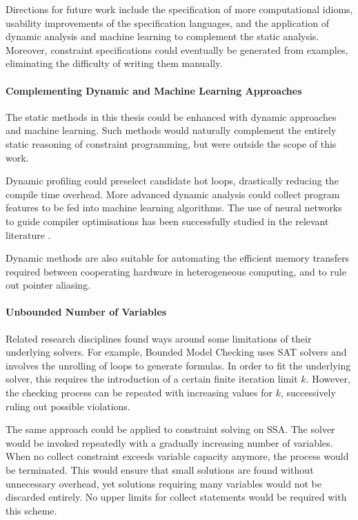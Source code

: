     Directions for future work include the specification of more computational
    idioms, usability improvements of the specification languages, and the
    application of dynamic analysis and machine learning to complement the
    static analysis.
    Moreover, constraint specifications could eventually be generated from
    examples, eliminating the difficulty of writing them manually.

\paragraph*{Complementing Dynamic and Machine Learning Approaches}

    The static methods in this thesis could be enhanced with dynamic approaches
    and machine learning.
    Such methods would naturally complement the entirely static reasoning of
    constraint programming, but were outside the scope of this work.

    Dynamic profiling could preselect candidate hot loops, drastically reducing
    the compile time overhead.
    More advanced dynamic analysis could collect program features to be fed into
    machine learning algorithms.
    The use of neural networks to guide compiler optimisations has been
    successfully studied in the relevant literature
    \citep{DBLP:journals/pieee/WangO18}.

    Dynamic methods are also suitable for automating the efficient memory
    transfers required between cooperating hardware in heterogeneous
    computing, and to rule out pointer aliasing.

\paragraph*{Unbounded Number of Variables}

    Related research disciplines found ways around some limitations of their
    underlying solvers.
    For example, Bounded Model Checking \cite{Clarke:2001:BMC:510986.510987}
    uses SAT solvers and involves the unrolling of loops to generate formulas.
    In order to fit the underlying solver, this requires the introduction of a
    certain finite iteration limit $k$.
    However, the checking process can be repeated with increasing values for
    $k$, successively ruling out possible violations.

    The same approach could be applied to constraint solving on SSA.
    The solver would be invoked repeatedly with a gradually increasing number of
    variables.
    When no collect constraint exceeds variable capacity anymore, the
    process would be terminated.
    This would ensure that small solutions are found without unnecessary
    overhead, yet solutions requiring many variables would not be discarded
    entirely.
    No upper limits for collect statements would be required with this scheme.

